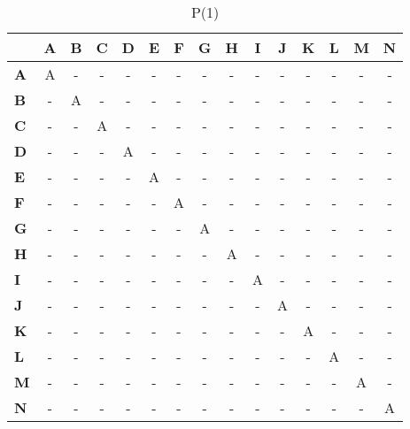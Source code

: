 \documentclass{article}
\begin{document}
\begin{table}[H]\centering
\caption{P(1)}
\begin{tabular}{l c c c c c c c c c c c c c c}
\toprule
 & \textbf{A} & \textbf{B} & \textbf{C} & \textbf{D} & \textbf{E} & \textbf{F} & \textbf{G} & \textbf{H} & \textbf{I} & \textbf{J} & \textbf{K} & \textbf{L} & \textbf{M} & \textbf{N}\\\midrule
\textbf{A} & \cellcolor{yellow!30}A & - & - & - & - & - & - & - & - & - & - & - & - & - \\
\textbf{B} & - & \cellcolor{yellow!30}A & - & - & - & - & - & - & - & - & - & - & - & - \\
\textbf{C} & - & - & \cellcolor{yellow!30}A & - & - & - & - & - & - & - & - & - & - & - \\
\textbf{D} & - & - & - & \cellcolor{yellow!30}A & - & - & - & - & - & - & - & - & - & - \\
\textbf{E} & - & - & - & - & \cellcolor{yellow!30}A & - & - & - & - & - & - & - & - & - \\
\textbf{F} & - & - & - & - & - & \cellcolor{yellow!30}A & - & - & - & - & - & - & - & - \\
\textbf{G} & - & - & - & - & - & - & \cellcolor{yellow!30}A & - & - & - & - & - & - & - \\
\textbf{H} & - & - & - & - & - & - & - & \cellcolor{yellow!30}A & - & - & - & - & - & - \\
\textbf{I} & - & - & - & - & - & - & - & - & \cellcolor{yellow!30}A & - & - & - & - & - \\
\textbf{J} & - & - & - & - & - & - & - & - & - & \cellcolor{yellow!30}A & - & - & - & - \\
\textbf{K} & - & - & - & - & - & - & - & - & - & - & \cellcolor{yellow!30}A & - & - & - \\
\textbf{L} & - & - & - & - & - & - & - & - & - & - & - & \cellcolor{yellow!30}A & - & - \\
\textbf{M} & - & - & - & - & - & - & - & - & - & - & - & - & \cellcolor{yellow!30}A & - \\
\textbf{N} & - & - & - & - & - & - & - & - & - & - & - & - & - & \cellcolor{yellow!30}A \\
\bottomrule
\end{tabular}
\end{table}
\end{document}
